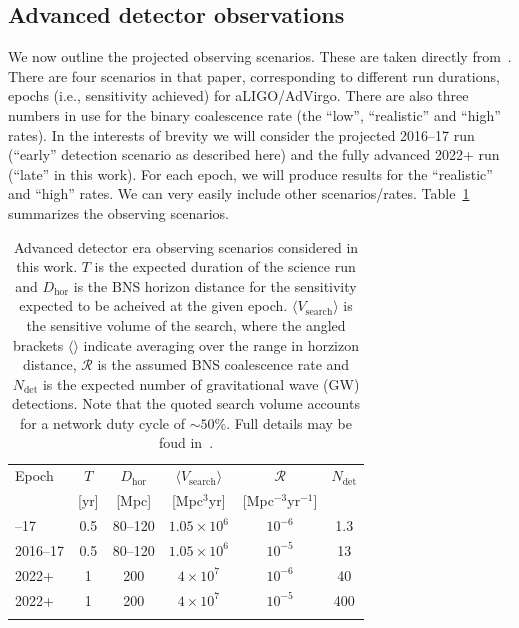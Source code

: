 \documentclass[twocolumn,nofootinbib]{revtex4-1}
\newcommand{\cbcrate}{{{\mathcal R}}}
\def\gw#1{gravitational wave#1 (GW#1)\gdef\gw{GW}}
\begin{document}
\subsection{Advanced detector observations}
We now outline the projected observing scenarios.  These are taken directly
from~\cite{ade_prospects}.  There are four scenarios in that paper,
corresponding to different run durations, epochs (i.e., sensitivity achieved)
for aLIGO/AdVirgo.  There are also three numbers in use for the binary
coalescence rate (the ``low'', ``realistic'' and ``high'' rates).  In the
interests of brevity we will consider the projected 2016--17 run (``early''
detection scenario as described here) and the fully advanced 2022+ run (``late''
in this work).  For each epoch, we will produce results for the ``realistic''
and ``high'' rates.   We can very easily include other scenarios/rates.
Table~\ref{table:scenarios} summarizes the observing scenarios.

\begin{table}
\centering
\begin{tabular}{l c c c c c }
\toprule
Epoch & $T$ & $D_{\mathrm{hor}}$ &
$\langle V_{\mathrm{search}}\rangle$ & $\cbcrate$ & $N_{\mathrm{det}}$ \\
 & [yr] & [Mpc] & [Mpc$^3$yr] &  [Mpc$^{-3}$yr$^{-1}$] \\
\colrule
2016--17 & 0.5 & 80--120 & $1.05\times10^6$ & $10^{-6}$ & 1.3 \\
2016--17 & 0.5 & 80--120 & $1.05\times10^6$ & $10^{-5}$ & 13 \\
2022+ & 1 & 200 & $4\times10^7$ & $10^{-6}$ & 40 \\
2022+ & 1 & 200 & $4\times10^7$ & $10^{-5}$ & 400 \\
\botrule
\end{tabular}
\caption{Advanced detector era observing scenarios considered in this work.  $T$
is the expected duration of the science run and $D_{\mathrm{hor}}$ is the BNS
horizon distance for the sensitivity expected to be acheived at the given epoch.
$\langle V_{\mathrm{search}}\rangle $ is the sensitive volume of the search,
where the angled brackets $\langle \rangle$ indicate averaging over the range
in horzizon distance, $\cbcrate$ is the assumed BNS coalescence rate and
$N_{\mathrm{det}}$ is the expected number of \gw{} detections.  Note that the
quoted search volume accounts for a network duty cycle of $\sim 50\%$.
Full details may be foud in~\cite{ade_prospects}.\label{table:scenarios}}
\end{table}
\end{document}
